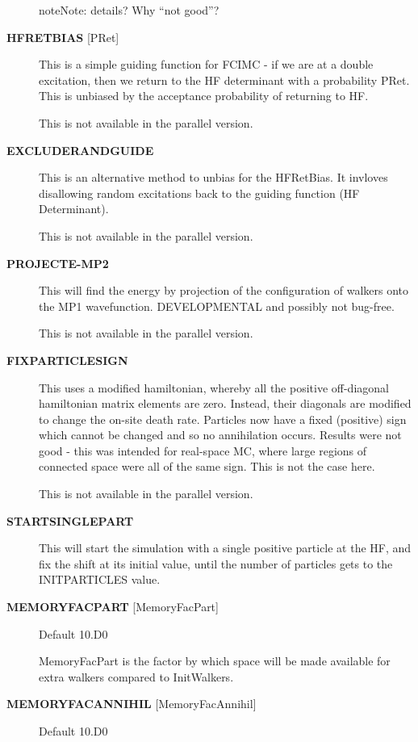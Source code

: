 \documentclass[openany,a4paper,10pt,english]{manual}
\begin{document}
\begin{description}
\begin{notice}{note}{Note:}
details?  Why ``not good''?
\end{notice}

\item[\textbf{HFRETBIAS} {[}PRet{]}] \leavevmode
This is a simple guiding function for FCIMC - if we are at a double
excitation, then we return to the HF determinant with a probability PRet.
This is unbiased by the acceptance probability of returning to HF.

This is not available in the parallel version.

\item[\textbf{EXCLUDERANDGUIDE}] \leavevmode
This is an alternative method to unbias for the HFRetBias. It invloves
disallowing random excitations back to the guiding function (HF
Determinant).

This is not available in the parallel version.

\item[\textbf{PROJECTE-MP2}] \leavevmode
This will find the energy by projection of the configuration of walkers
onto the MP1 wavefunction.  DEVELOPMENTAL and possibly not bug-free.

This is not available in the parallel version.

\item[\textbf{FIXPARTICLESIGN}] \leavevmode
This uses a modified hamiltonian, whereby all the positive off-diagonal
hamiltonian matrix elements are zero. Instead, their diagonals are modified
to change the on-site death rate. Particles now have a fixed (positive)
sign which cannot be changed and so no annihilation occurs.  Results were
not good - this was intended for real-space MC, where large regions of connected
space were all of the same sign. This is not the case here.

This is not available in the parallel version.

\item[\textbf{STARTSINGLEPART}] \leavevmode
This will start the simulation with a single positive particle at the HF,
and fix the shift at its initial value, until the number of particles gets
to the INITPARTICLES value.

\item[\textbf{MEMORYFACPART} {[}MemoryFacPart{]}] \leavevmode
Default 10.D0

MemoryFacPart is the factor by which space will be made available for extra
walkers compared to InitWalkers.

\item[\textbf{MEMORYFACANNIHIL} {[}MemoryFacAnnihil{]}] \leavevmode
Default 10.D0


\end{description}
\end{document}
